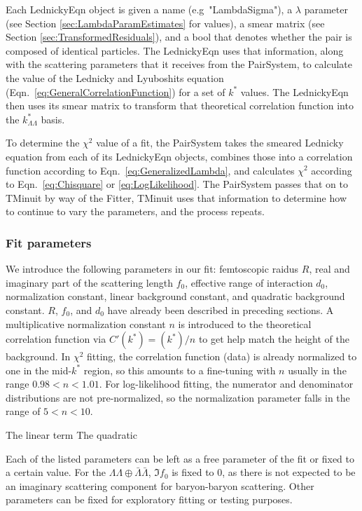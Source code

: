 Each LednickyEqn object is given a name (e.g\ "LambdaSigma"), a $\lambda$ parameter (see Section \ref{sec:LambdaParamEstimates} for values), a smear matrix (see Section \ref{sec:TransformedResiduals}), and a bool that denotes whether the pair is composed of identical particles.
The LednickyEqn uses that information, along with the scattering parameters that it receives from the PairSystem, to calculate the value of the Lednicky and Lyuboshits equation (Eqn.\ \ref{eq:GeneralCorrelationFunction}) for a set of $k^*$ values.
The LednickyEqn then uses its smear matrix to transform that theoretical correlation function into the $k^*_{\Lambda\Lambda}$ basis.

To determine the $\chi^2$ value of a fit, the PairSystem takes the smeared Lednicky equation from each of its LednickyEqn objects, combines those into a correlation function according to Eqn.\ \ref{eq:GeneralizedLambda}, and calculates $\chi^2$ according to Eqn.\ \ref{eq:Chisquare} or \ref{eq:LogLikelihood}.
The PairSystem passes that on to TMinuit by way of the Fitter, TMinuit uses that information to determine how to continue to vary the parameters, and the process repeats.

\subsubsection{Fit parameters}

We introduce the following parameters in our fit: femtoscopic raidus $R$, real and imaginary part of the scattering length $f_0$, effective range of interaction $d_0$, normalization constant, linear background constant, and quadratic background constant.
$R$, $f_0$, and $d_0$ have already been described in preceding sections.
A multiplicative normalization constant $n$ is introduced to the theoretical correlation function via $C'(k^*) = (k^*)/n$ to get help match the height of the background.
In $\chi^2$ fitting, the correlation function (data) is already normalized to one in the mid-$k^*$ region, so this amounts to a fine-tuning with $n$ usually in the range $0.98 < n < 1.01$.
For log-likelihood fitting, the numerator and denominator distributions are not pre-normalized, so the normalization parameter falls in the range of $5 < n < 10$.



The linear term
The quadratic 



Each of the listed parameters can be left as a free parameter of the fit or fixed to a certain value.
For the $\Lambda\Lambda \oplus \bar{\Lambda}\bar{\Lambda}$, $\Im f_0$ is fixed to 0, as there is not expected to be an imaginary scattering component for baryon-baryon scattering.
Other parameters can be fixed for exploratory fitting or testing purposes.



